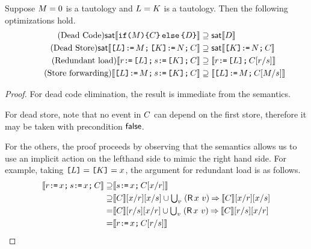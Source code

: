 \begin{lemma}
  Suppose $M=0$ is a tautology and $L=K$ is a tautology.  Then the following optimizations hold.
  \begin{align*}
  \tag{Dead Code} 
  \mathsf{sat}\llbracket\texttt{if}\allowbreak\texttt{(}M\texttt{)}\allowbreak\texttt{\{}C\texttt{\}}\,\allowbreak\texttt{else}\allowbreak\,\texttt{\{}D\texttt{\}}\rrbracket &\supseteq 
  \mathsf{sat}\llbracket D\rrbracket \\
  \tag{Dead Store} 
  \mathsf{sat}\llbracket\texttt{[}L\texttt{]} \texttt{:}\mkern-1mu\texttt{=}\, M \texttt{;}\, \texttt{[}K\texttt{]} \texttt{:}\mkern-1mu\texttt{=}\, N \texttt{;}\, C\rrbracket &\supseteq 
  \mathsf{sat}\llbracket\texttt{[}K\texttt{]} \texttt{:}\mkern-1mu\texttt{=}\, N \texttt{;}\, C\rrbracket\\    
  \tag{Redundant load}
  \llbracket r \texttt{:}\mkern-1mu\texttt{=}\, \texttt{[}L\texttt{]} \texttt{;}\, s \texttt{:}\mkern-1mu\texttt{=}\, \texttt{[}K\texttt{]}  \texttt{;}\, C\rrbracket &\supseteq
  \llbracket r \texttt{:}\mkern-1mu\texttt{=}\, \texttt{[}L\texttt{]} \texttt{;}\, C[r/s]\rrbracket \\
  \tag{Store forwarding} 
  \llbracket\texttt{[}L\texttt{]} \texttt{:}\mkern-1mu\texttt{=}\, M \texttt{;}\, s \texttt{:}\mkern-1mu\texttt{=}\, \texttt{[}K\texttt{]} \texttt{;}\, C\rrbracket &\supseteq 
  \llbracket\texttt{[}L\texttt{]} \texttt{:}\mkern-1mu\texttt{=}\, M \texttt{;}\, C[M/s]\rrbracket
\end{align*}
\begin{proof}
  For dead code elimination, the result is immediate from the semantics.
  
  For dead store, note that no event in $C$ can depend on the first store,
  therefore it may be taken with precondition $\mathsf{false}$.
  
  For the others, the proof proceeds by observing that the semantics allows us
  to use an implicit action on the lefthand side to mimic the right hand side.
  For example, taking $\texttt{[}L\texttt{]}=\texttt{[}K\texttt{]}=x$, the argument for
  redundant load is as follows.
  \begin{align*}
    \sem{\aReg \GETS \aLoc \SEMI \bReg \GETS \aLoc  \SEMI \aCmd} 
    \supseteq&  \sem{ \bReg  \GETS \aLoc \SEMI \aCmd[\aLoc/\aReg]} \\
    \supseteq&  \sem{\aCmd}[\aLoc/\aReg][\aLoc/\bReg] \cup  \textstyle\bigcup_\aVal\;  (\DR\aLoc\aVal) \prefix \sem{\aCmd}[\aLoc/\aReg][\aLoc/\bReg]\\
    =& \sem{\aCmd}[\aReg/ \bReg][\aLoc/\aReg] \cup  \textstyle\bigcup_\aVal\;  (\DR\aLoc\aVal) \prefix \sem{\aCmd}[\aReg/ \bReg][\aLoc/\aReg]\\
    =& \sem{\aReg \GETS \aLoc\SEMI \aCmd[\aReg/\bReg]}
    \tag*{\qedhere}
  \end{align*}
\end{proof}
\end{lemma}
  
